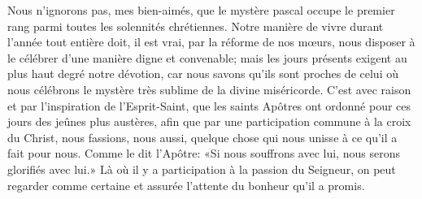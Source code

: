 Nous n’ignorons pas, mes bien-aimés,
	que le mystère pascal occupe le premier rang
		parmi toutes les solennités chrétiennes.
Notre manière de vivre durant l’année tout entière
	doit, il est vrai, par la réforme de nos mœurs,
	nous disposer à le célébrer d’une manière digne et convenable;
	mais les jours présents exigent au plus haut degré notre dévotion,
	car nous savons qu’ils sont proches de celui où nous célébrons
		le mystère très sublime de la divine miséricorde.
C’est avec raison et par l’inspiration de l’Esprit-Saint,
	que les saints Apôtres ont ordonné pour ces jours des jeûnes plus austères,
	afin que par une participation commune à la croix du Christ,
	nous fassions, nous aussi, quelque chose qui nous unisse
		à ce qu’il a fait pour nous.
Comme le dit l’Apôtre:
	«Si nous souffrons avec lui, nous serons glorifiés avec lui.»
Là où il y a participation à la passion du Seigneur,
	on peut regarder comme certaine et assurée
		l’attente du bonheur qu’il a promis.
